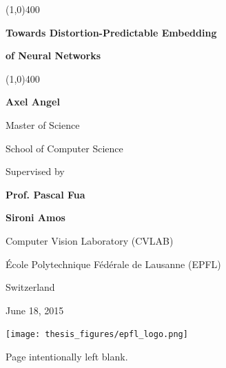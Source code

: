 \documentclass[a4paper,12pt]{report}
\date{\mydate}
\newcommand{\myname}{Axel Angel}
\newcommand{\mydate}{June 18, 2015}
\begin{document}
\begin{titlepage}
\begin{center}
    \vspace*{0.5cm}

    \line(1,0){400}
    \vspace{0.5cm}

    {\bf \Large Towards Distortion-Predictable Embedding}

    \vspace{0.5cm}

    {\bf \Large of Neural Networks}

    \vspace{0.5cm}
    \line(1,0){400}

    \vspace{1.5cm}

    {\bf \myname}

    Master of Science

    School of Computer Science

    \vspace{1.6cm}

    Supervised by

    {\bf Prof. Pascal Fua}

    {\bf Sironi Amos}

    \vspace{0.8cm}

    Computer Vision Laboratory (CVLAB)

    École Polytechnique Fédérale de Lausanne (EPFL)

    Switzerland

    \vspace{3cm}

    \mydate

    \vfill

    \texttt{[image: thesis\_figures/epfl\_logo.png]}


    \end{center}
\end{titlepage}

\newpage
\thispagestyle{empty}
\vfill
\begin{center}
    Page intentionally left blank.
\end{center}
\end{document}
